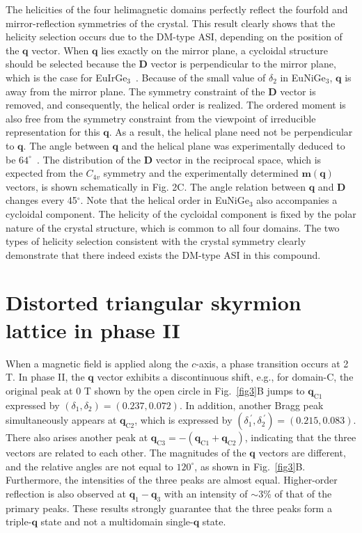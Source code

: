 \documentclass[aps,prb,reprint,superscriptaddress,amsmath,amssymb]{revtex4-2}
\begin{document}
The helicities of the four helimagnetic domains perfectly reflect the fourfold and mirror-reflection symmetries of the crystal. 
This result clearly shows that the helicity selection occurs due to the DM-type ASI, depending on the position of the $\bm{q}$ vector. 
When $\bm{q}$ lies exactly on the mirror plane, a cycloidal structure should be selected because the $\bm{D}$ vector is perpendicular to the mirror plane, which is the case for EuIrGe$_3$~\cite{Matsumura22,Kurauchi23,Yambe22}. 
Because of the small value of $\delta_2$ in EuNiGe$_3$, $\bm{q}$ is away from the mirror plane. 
The symmetry constraint of the $\bm{D}$ vector is removed, and consequently, the helical order is realized. 
The ordered moment is also free from the symmetry constraint from the viewpoint of irreducible representation for this $\bm{q}$. 
As a result, the helical plane need not be perpendicular to $\bm{q}$. 
The angle between $\bm{q}$ and the helical plane was experimentally deduced to be $64^{\circ}$~\cite{SM}. 
The distribution of the $\bm{D}$ vector in the reciprocal space, which is expected from the $C_{4v}$ symmetry and the experimentally determined $\bm{m}(\bm{q})$ vectors, is shown schematically in Fig. 2C. 
The angle relation between $\bm{q}$ and $\bm{D}$ changes every 45$^{\circ}$. 
Note that the helical order in EuNiGe$_3$ also accompanies a cycloidal component. 
The helicity of the cycloidal component is fixed by the polar nature of the crystal structure, which is common to all four domains. 
The two types of helicity selection consistent with the crystal symmetry clearly demonstrate that there indeed exists the DM-type ASI in this compound. 

\section{Distorted triangular skyrmion lattice in phase II}
When a magnetic field is applied along the $c$-axis, a phase transition occurs at 2 T. In phase II, the $\bm{q}$ vector exhibits a discontinuous shift, e.g., for domain-C, the original peak at 0 T shown by the open circle in Fig.~\ref{fig3}B jumps to $\bm{q}_{\text{C}1}$ expressed by $(\delta_1, \delta_2)=(0.237,0.072)$. In addition, another Bragg peak simultaneously appears at $\bm{q}_{\text{C}2}$, which is expressed by $(\delta_1^{\;\prime}, \delta_2^{\;\prime})=(0.215, 0.083)$. There also arises another peak at $\bm{q}_{\text{C}3}=-(\bm{q}_{\text{C}1}+\bm{q}_{\text{C}2})$, indicating that the three vectors are related to each other. 
The magnitudes of the $\bm{q}$ vectors are different, and the relative angles are not equal to $120^{\circ}$, as shown in Fig.~\ref{fig3}B. 
Furthermore, the intensities of the three peaks are almost equal. 
Higher-order reflection is also observed at $\bm{q}_1- \bm{q}_3$ with an intensity of $\sim 3$\% of that of the primary peaks. 
These results strongly guarantee that the three peaks form a triple-$\bm{q}$ state and not a multidomain single-$\bm{q}$ state. 
\end{document}

